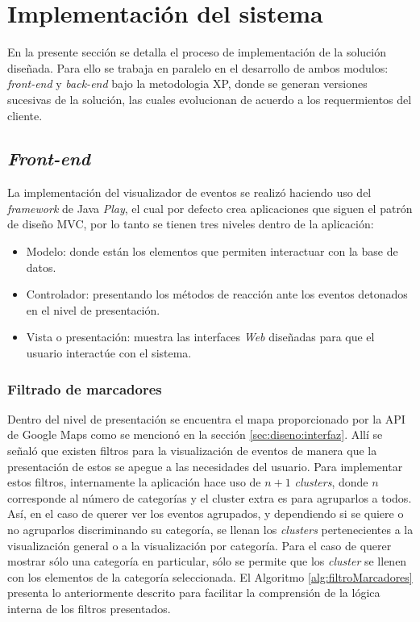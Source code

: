 \section{Implementación del sistema}
\label{sec:implementacion}

En la presente sección se detalla el proceso de implementación de la solución diseñada. Para ello se trabaja en paralelo en el desarrollo de ambos modulos: \textit{front-end} y \textit{back-end} bajo la metodologia XP, donde se generan versiones sucesivas de la solución, las cuales evolucionan de acuerdo a los requermientos del cliente.

\subsection{\textit{Front-end}}
\label{subsec:imp:visualizador}

La implementación del visualizador de eventos se realizó haciendo uso del \textit{framework} de Java \textit{Play}, el cual por defecto crea aplicaciones que siguen el patrón de diseño MVC, por lo tanto se tienen tres niveles dentro de la aplicación:

\begin{itemize}
\item Modelo: donde están los elementos que permiten interactuar con la base de datos. 
\item Controlador: presentando los métodos de reacción ante los eventos detonados en el nivel de presentación.
\item Vista o presentación: muestra las interfaces \textit{Web} diseñadas para que el usuario interactúe con el sistema.
\end{itemize}

\subsubsection*{Filtrado de marcadores}
\label{subsubsec:filtradoMarcadores}

Dentro del nivel de presentación se encuentra el mapa proporcionado por la API de Google Maps como se mencionó en la sección \ref{sec:diseno:interfaz}. Allí se señaló que existen filtros para la visualización de eventos de manera que la presentación de estos se apegue a las necesidades del usuario. Para implementar estos filtros, internamente la aplicación hace uso de $n + 1$ \textit{clusters}, donde $n$ corresponde al número de categorías y el cluster extra es para agruparlos a todos. Así, en el caso de querer ver los eventos agrupados, y dependiendo si se quiere o no agruparlos discriminando su categoría, se llenan los \textit{clusters} pertenecientes a la visualización general o a la visualización por categoría. Para el caso de querer mostrar sólo una categoría en particular, sólo se permite que los \textit{cluster} se llenen con los elementos de la categoría seleccionada. El Algoritmo \ref{alg:filtroMarcadores} presenta lo anteriormente descrito para facilitar la comprensión de la lógica interna de los filtros presentados.\\

